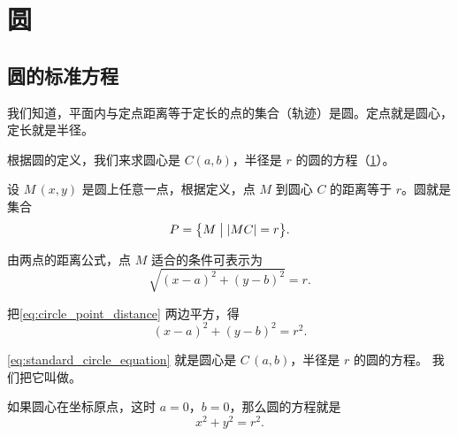 \section{圆}
\subsection{圆的标准方程}
我们知道，平面内与定点距离等于定长的点的集合（轨迹）是圆。定点就是圆心，定长就是半径。

根据圆的定义，我们来求圆心是 $C(a,b)$，半径是 $r$ 的圆的方程（\cref{fig:2-7}）。
\begin{figure}
  \caption{}\label{fig:2-7}
\end{figure}

设 $M\,(x,y)$ 是圆上任意一点，根据定义，点 $M$ 到圆心 $C$ 的距离等于 $r$。圆就是集合
\[ P=\bigl\{ M \bigm\vert |MC|=r \bigr\}.\]

由两点的距离公式，点 $M$ 适合的条件可表示为
\begin{equation}
  \label{eq:circle_point_distance}
  \sqrt{(x-a)^2+(y-b)^2}=r.
\end{equation}

把\cref{eq:circle_point_distance} 两边平方，得
\begin{equation}
  \label{eq:standard_circle_equation}
  (x-a)^2+(y-b)^2=r^2.
\end{equation}

\cref{eq:standard_circle_equation} 就是圆心是 $C\,(a,b)$，半径是 $r$ 的圆的方程。
我们把它叫做。 

如果圆心在坐标原点，这时 $a=0$，$b=0$，那么圆的方程就是
\[ x^2+y^2=r^2.\]

\begin{example}\end{example}
\begin{solution}\end{solution}

\begin{example}\end{example}
\begin{solution}\end{solution}

\begin{example}\end{example}
\begin{solution}\end{solution}

\begin{example}\end{example}
\begin{solution}\end{solution}

